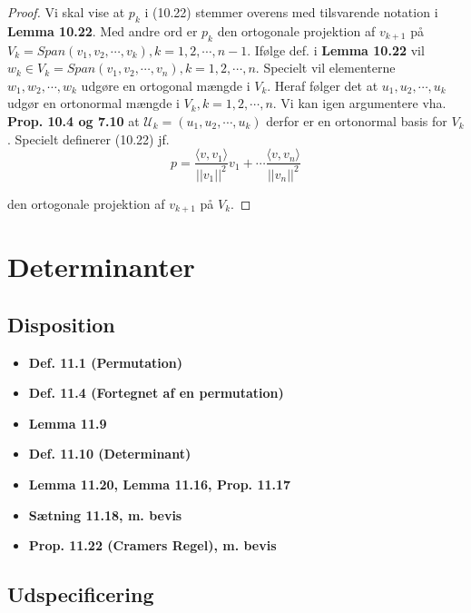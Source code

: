 \documentclass[paper=a4, fontsize=11pt]{scrartcl} %
\begin{document}
			\begin{proof}
				
				Vi skal vise at $p_k$ i (10.22) stemmer overens med tilsvarende notation i \textbf{Lemma 10.22}. Med andre ord er $p_k$ den ortogonale projektion af $v_{k+1}$ på $V_k = Span(v_1,v_2,\cdots,v_k), k = 1,2,\cdots,n-1$.
				Ifølge def. i \textbf{Lemma 10.22} vil $w_k \in V_k = Span(v_1,v_2,\cdots,v_n), k = 1,2,\cdots,n$. Specielt vil elementerne $w_1,w_2,\cdots,w_k$ udgøre en ortogonal mængde i $V_k$. Heraf følger det at $u_1,u_2,\cdots,u_k$ udgør en ortonormal mængde i $V_k, k = 1,2,\cdots,n$. Vi kan igen argumentere vha. \textbf{Prop. 10.4 og 7.10} at $\mathcal{U}_k = (u_1,u_2,\cdots,u_k)$ derfor er en ortonormal basis for $V_k$. Specielt definerer (10.22) jf. 
				\[p = \frac{\langle v,v_1\rangle}{||v_1||^2} v_1 + \cdots \frac{\langle v,v_n \rangle}{||v_n||^2}\]
				
				den ortogonale projektion af $v_{k+1}$ på $V_k$.
				
			\end{proof}
			
			
			
			
			\newpage
			
			\section{Determinanter}
			
			\subsection{Disposition}
			
			\begin{itemize}
				\item \textbf{Def. 11.1 (Permutation)}
				\item \textbf{Def. 11.4 (Fortegnet af en permutation)}
				\item \textbf{Lemma 11.9}
				\item \textbf{Def. 11.10 (Determinant)}
				\item \textbf{Lemma 11.20, Lemma 11.16, Prop. 11.17}
				\item \textbf{Sætning 11.18, m. bevis}
				\item \textbf{Prop. 11.22 (Cramers Regel), m. bevis}
			\end{itemize}
			
			\subsection{Udspecificering}
			
\end{document}
